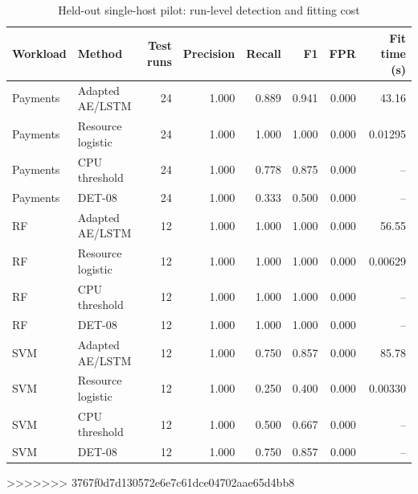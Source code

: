 \begin{table}[t]
\caption{Held-out single-host pilot: run-level detection and fitting cost}
\label{tab:pilot}
\centering\small
\begin{tabular}{llrrrrrr}
\toprule
Workload & Method & Test runs & Precision & Recall & F1 & FPR & Fit time (s) \\
\midrule
Payments & Adapted AE/LSTM & 24 & 1.000 & 0.889 & 0.941 & 0.000 & 43.16 \\
Payments & Resource logistic & 24 & 1.000 & 1.000 & 1.000 & 0.000 & 0.01295 \\
Payments & CPU threshold & 24 & 1.000 & 0.778 & 0.875 & 0.000 & -- \\
Payments & DET-08 & 24 & 1.000 & 0.333 & 0.500 & 0.000 & -- \\
RF & Adapted AE/LSTM & 12 & 1.000 & 1.000 & 1.000 & 0.000 & 56.55 \\
RF & Resource logistic & 12 & 1.000 & 1.000 & 1.000 & 0.000 & 0.00629 \\
RF & CPU threshold & 12 & 1.000 & 1.000 & 1.000 & 0.000 & -- \\
RF & DET-08 & 12 & 1.000 & 1.000 & 1.000 & 0.000 & -- \\
SVM & Adapted AE/LSTM & 12 & 1.000 & 0.750 & 0.857 & 0.000 & 85.78 \\
SVM & Resource logistic & 12 & 1.000 & 0.250 & 0.400 & 0.000 & 0.00330 \\
SVM & CPU threshold & 12 & 1.000 & 0.500 & 0.667 & 0.000 & -- \\
SVM & DET-08 & 12 & 1.000 & 0.750 & 0.857 & 0.000 & -- \\
\bottomrule
\end{tabular}
\end{table}
>>>>>>> 3767f0d7d130572e6e7c61dce04702aae65d4bb8
